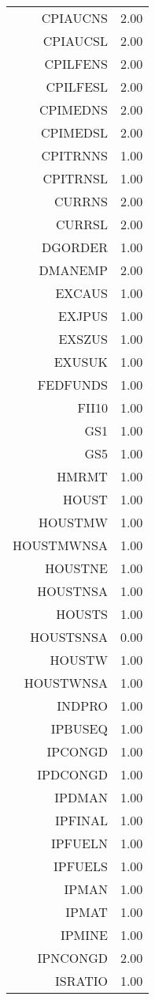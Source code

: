 \begin{table}[ht]
\begin{tabular}{rr}
  CPIAUCNS & 2.00 \\ 
  CPIAUCSL & 2.00 \\ 
  CPILFENS & 2.00 \\ 
  CPILFESL & 2.00 \\ 
  CPIMEDNS & 2.00 \\ 
  CPIMEDSL & 2.00 \\ 
  CPITRNNS & 1.00 \\ 
  CPITRNSL & 1.00 \\ 
  CURRNS & 2.00 \\ 
  CURRSL & 2.00 \\ 
  DGORDER & 1.00 \\ 
  DMANEMP & 2.00 \\ 
  EXCAUS & 1.00 \\ 
  EXJPUS & 1.00 \\ 
  EXSZUS & 1.00 \\ 
  EXUSUK & 1.00 \\ 
  FEDFUNDS & 1.00 \\ 
  FII10 & 1.00 \\ 
  GS1 & 1.00 \\ 
  GS5 & 1.00 \\ 
  HMRMT & 1.00 \\ 
  HOUST & 1.00 \\ 
  HOUSTMW & 1.00 \\ 
  HOUSTMWNSA & 1.00 \\ 
  HOUSTNE & 1.00 \\ 
  HOUSTNSA & 1.00 \\ 
  HOUSTS & 1.00 \\ 
  HOUSTSNSA & 0.00 \\ 
  HOUSTW & 1.00 \\ 
  HOUSTWNSA & 1.00 \\ 
  INDPRO & 1.00 \\ 
  IPBUSEQ & 1.00 \\ 
  IPCONGD & 1.00 \\ 
  IPDCONGD & 1.00 \\ 
  IPDMAN & 1.00 \\ 
  IPFINAL & 1.00 \\ 
  IPFUELN & 1.00 \\ 
  IPFUELS & 1.00 \\ 
  IPMAN & 1.00 \\ 
  IPMAT & 1.00 \\ 
  IPMINE & 1.00 \\ 
  IPNCONGD & 2.00 \\ 
  ISRATIO & 1.00 \\ 

\end{tabular}
\end{table}
